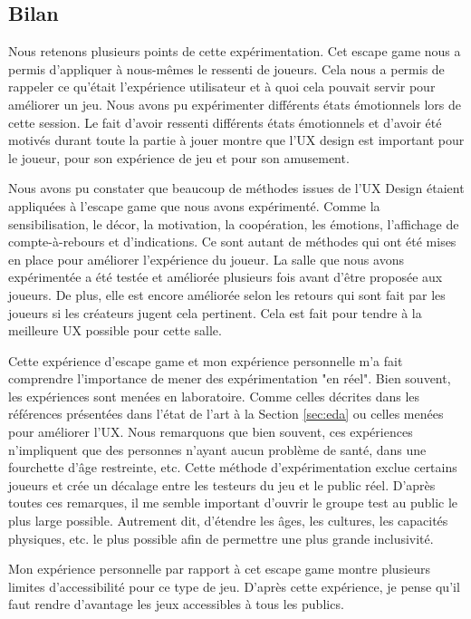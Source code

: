 \documentclass[11pt]{article}
\begin{document}
	\subsection{Bilan}\label{sec:escapebilan}
		Nous retenons plusieurs points de cette expérimentation.
		Cet escape game nous a permis d'appliquer à nous-mêmes le ressenti de joueurs.
		Cela nous a permis de rappeler ce qu'était l'expérience utilisateur et à quoi cela pouvait servir pour améliorer un jeu.
		Nous avons pu expérimenter différents états émotionnels lors de cette session.
		Le fait d'avoir ressenti différents états émotionnels et d'avoir été motivés durant toute la partie à jouer montre que l'UX design est important pour le joueur, pour son expérience de jeu et pour son amusement.\par
		Nous avons pu constater que beaucoup de méthodes issues de l'UX Design étaient appliquées à l'escape game que nous avons expérimenté.
		Comme la sensibilisation, le décor, la motivation, la coopération, les émotions, l'affichage de compte-à-rebours et d'indications.
		Ce sont autant de méthodes qui ont été mises en place pour améliorer l'expérience du joueur.
		La salle que nous avons expérimentée a été testée et améliorée plusieurs fois avant d'être proposée aux joueurs.
		De plus, elle est encore améliorée selon les retours qui sont fait par les joueurs si les créateurs jugent cela pertinent.
		Cela est fait pour tendre à la meilleure UX possible pour cette salle.\par
		Cette expérience d'escape game et mon expérience personnelle m'a fait comprendre l'importance de mener des expérimentation "en réel".
		Bien souvent, les expériences sont menées en laboratoire.
		Comme celles décrites dans les références présentées dans l'état de l'art à la Section \ref{sec:eda} ou celles menées pour améliorer l'UX.
		Nous remarquons que bien souvent, ces expériences n'impliquent que des personnes n'ayant aucun problème de santé, dans une fourchette d'âge restreinte, etc.
		Cette méthode d'expérimentation exclue certains joueurs et crée un décalage entre les testeurs du jeu et le public réel.
		D'après toutes ces remarques, il me semble important d'ouvrir le groupe test au public le plus large possible.
		Autrement dit, d'étendre les âges, les cultures, les capacités physiques, etc. le plus possible afin de permettre une plus grande inclusivité.\par
		Mon expérience personnelle par rapport à cet escape game montre plusieurs limites d'accessibilité pour ce type de jeu.
		D'après cette expérience, je pense qu'il faut rendre d'avantage les jeux accessibles à tous les publics.
\end{document}
